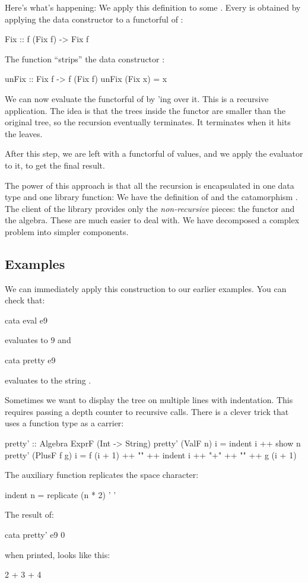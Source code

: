 \documentclass[DaoFP]{subfiles}
\begin{document}
Here's what's happening: We apply this definition to some . Every  is obtained by applying the data constructor  to a functorful of :
\begin{haskell}
Fix :: f (Fix f) -> Fix f
\end{haskell}
The function  ``strips'' the data constructor :
\begin{haskell}
unFix :: Fix f -> f (Fix f)
unFix (Fix x) = x
\end{haskell}

We can now evaluate the functorful of  by 'ing  over it. This is a recursive application. The idea is that the trees inside the functor are smaller than the original tree, so the recursion eventually terminates. It terminates when it hits the leaves. 

After this step, we are left with a functorful of values, and we apply the evaluator  to it, to get the final result.

The power of this approach is that all the recursion is encapsulated in one data type and one library function: We have the definition of  and the catamorphism . The client of the library provides only the \emph{non-recursive} pieces: the functor and the algebra. These are much easier to deal with. We have decomposed a complex problem into simpler components.

\subsection{Examples}

We can immediately apply this construction to our earlier examples. You can check that:
\begin{haskell}
cata eval e9
\end{haskell}
evaluates to $9$ and
\begin{haskell}
cata pretty e9
\end{haskell}
evaluates to the string .

Sometimes we want to display the tree on multiple lines with indentation. This requires passing a depth counter to recursive calls. There is a clever trick that uses a function type as a carrier:
\begin{haskell}
pretty' :: Algebra ExprF (Int -> String)
pretty' (ValF n) i = indent i ++ show n
pretty' (PlusF f g) i = f (i + 1) ++ "\n" ++
                        indent i ++ "+" ++ "\n" ++
                        g (i + 1)
\end{haskell}
The auxiliary function  replicates the space character:
\begin{haskell}
indent n = replicate (n * 2) ' '
\end{haskell}
The result of:
\begin{haskell}
cata pretty' e9 0
\end{haskell}
when printed, looks like this:
\begin{haskell}
    2
  +
    3
+
  4
\end{haskell}
\end{document}
